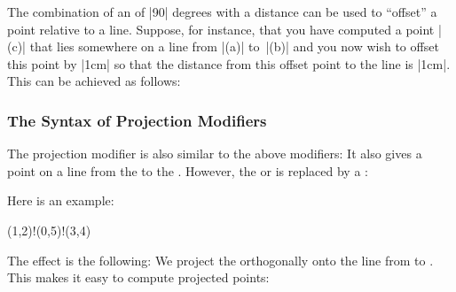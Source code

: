 The combination of an  of |90| degrees with a distance can be used
to ``offset'' a point relative to a line. Suppose, for instance, that you have
computed a point |(c)| that lies somewhere on a line from |(a)| to~|(b)| and
you now wish to offset this point by |1cm| so that the distance from this
offset point to the line is |1cm|. This can be achieved as follows:
%
\begin{codeexample}[preamble={\usetikzlibrary{calc}}]
\end{codeexample}


\subsubsection{The Syntax of Projection Modifiers}

The projection modifier is also similar to the above modifiers: It also gives a
point on a line from the  to the .
However, the  or  is replaced by a
:
%
\begin{quote}
\end{quote}

Here is an example:
%
\begin{codeexample}
(1,2)!(0,5)!(3,4)
\end{codeexample}

The effect is the following: We project the 
orthogonally onto the line from  to .
This makes it easy to compute projected points:
%
\begin{codeexample}[preamble={\usetikzlibrary{calc}}]
\end{codeexample}
